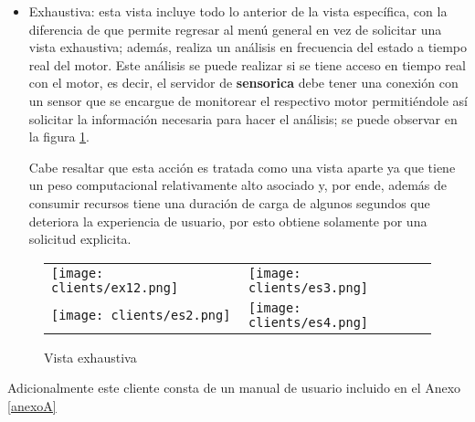 \begin{itemize}
        \vspace{-1.5cm}
    \item Exhaustiva: esta vista incluye todo lo anterior de la vista específica,
        con la diferencia de que permite regresar al menú general en vez de solicitar
        una vista exhaustiva; además, realiza un análisis en frecuencia
        del estado a tiempo real del motor. Este análisis se puede realizar si
        se tiene acceso en tiempo real con el motor, es decir,
        el servidor de \textbf{sensorica} debe tener una conexión con un sensor que se
        encargue de monitorear el respectivo motor permitiéndole así solicitar
        la información necesaria para hacer el análisis;
        se puede observar en la figura \ref{img:VistaExhaustiva}.

        Cabe resaltar que esta acción es tratada como una vista aparte ya que
        tiene un peso computacional relativamente alto asociado y, por ende,
        además de consumir recursos tiene una duración de carga de algunos
        segundos que deteriora la experiencia de usuario, por esto
        obtiene solamente por una solicitud explicita.
\end{itemize}

\begin{center}
    \begin{figure}[htb]
		\centering
        \caption{Vista exhaustiva}
            \begin{tabular}{m{6cm}m{6cm}}
                \texttt{[image: clients/ex12.png]}&
        \texttt{[image: clients/es3.png]}\\
                \texttt{[image: clients/es2.png]}&
        \texttt{[image: clients/es4.png]}\\
            \end{tabular}
        \label{img:VistaExhaustiva}
	\end{figure}
\end{center}

\vspace*{-1.5cm}

Adicionalmente este cliente consta de un manual de usuario incluido
en el Anexo \ref{anexoA}
